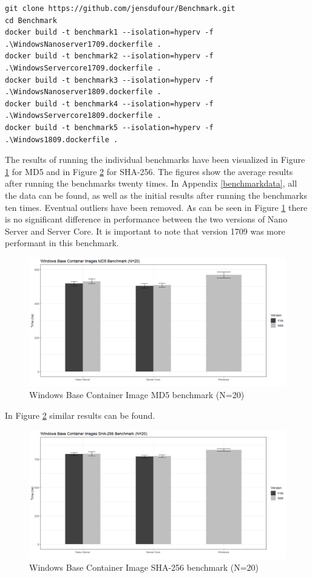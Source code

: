 \begin{lstlisting}[breaklines]
git clone https://github.com/jensdufour/Benchmark.git
cd Benchmark	
docker build -t benchmark1 --isolation=hyperv -f .\WindowsNanoserver1709.dockerfile .
docker build -t benchmark2 --isolation=hyperv -f .\WindowsServercore1709.dockerfile .
docker build -t benchmark3 --isolation=hyperv -f .\WindowsNanoserver1809.dockerfile .
docker build -t benchmark4 --isolation=hyperv -f .\WindowsServercore1809.dockerfile .
docker build -t benchmark5 --isolation=hyperv -f .\Windows1809.dockerfile .
\end{lstlisting}

The results of running the individual benchmarks have been visualized in Figure \ref{fig:MD5} for MD5 and in Figure \ref{fig:SHA} for SHA-256. 
The figures show the average results after running the benchmarks twenty times. 
In Appendix \ref{benchmarkdata}, all the data can be found, as well as the initial results after running the benchmarks ten times. 
Eventual outliers have been removed. 
As can be seen in Figure \ref{fig:MD5} there is no significant difference in performance between the two versions of Nano Server and Server Core.
It is important to note that version 1709 was more performant in this benchmark. 

\begin{figure}[h]
	\captionsetup{width=0.8\linewidth}
	\includegraphics[width=0.9\linewidth]{img/Methodologie/Containers1.png}
	\centering
	\caption[MD5 benchmark]{Windows Base Container Image MD5 benchmark (N=20)}
	\label{fig:MD5}
\end{figure}

In Figure \ref{fig:SHA} similar results can be found. 

\begin{figure}[h]
	\captionsetup{width=0.8\linewidth}
	\includegraphics[width=0.9\linewidth]{img/Methodologie/Containers2.png}
	\centering
	\caption[SHA-256 benchmark]{Windows Base Container Image SHA-256 benchmark (N=20)}
	\label{fig:SHA}
\end{figure}

